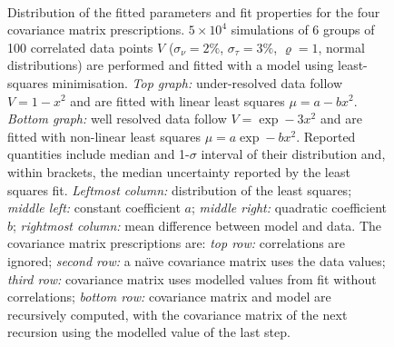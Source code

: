 \documentclass[a4paper,fleqn,usenatbib]{mnras}
\def\norm{_\tau}
\def\meas{_\nu}
\def\data{\ensuremath{{\scriptstyle V}}}
\def\dev{\ensuremath{\sigma}}
\def\reldev{\ensuremath{\dev\norm}}
\def\absdev{\ensuremath{\dev\meas}}
\def\corr{\ensuremath{\varrho}}
\begin{document}
\begin{figure}
\centering
{}\\
\caption{Distribution of the fitted parameters and fit properties for the four covariance matrix prescriptions. $5\times10^4$ simulations of 6 groups of 100 correlated data points $\data$ ($\absdev = 2\%$, $\reldev = 3\%$, $\corr = 1$, normal distributions) are performed and fitted with a model using least-squares minimisation. \emph{Top graph:} under-resolved data follow $\data = 1-x^2$ and are fitted with linear least squares $\mu = a - bx^2$. \emph{Bottom graph:} well resolved data follow $\data = \exp -3x^2$ and are fitted with non-linear least squares $\mu = a\exp -bx^2$. Reported quantities include median and 1-$\sigma$ interval of their distribution and, within brackets, the median uncertainty reported by the least squares fit. \emph{Leftmost column:} distribution of the least squares; \emph{middle left:} constant coefficient $a$; \emph{middle right:} quadratic coefficient $b$; \emph{rightmost column:} mean difference between model and data. The covariance matrix prescriptions are: \emph{top row:} correlations are ignored; \emph{second row:} a na\"\i{}ve covariance matrix uses the data values; \emph{third row:} covariance matrix uses modelled values from fit without correlations; \emph{bottom row:} covariance matrix and model are recursively computed, with the covariance matrix of the next recursion using the modelled value of the last step. }
\end{figure}
\end{document}
